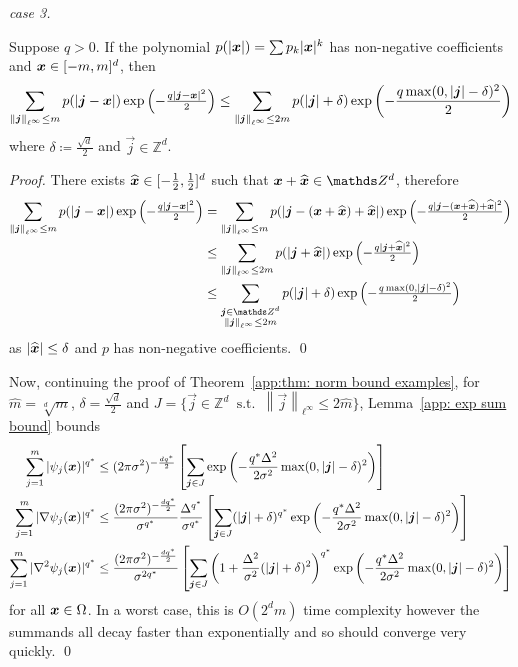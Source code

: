 \documentclass[smallextended]{svjour3}
\let\F\mathds\let\C\mathcal\newcommand{\R}{\F{R}}\newcommand{\A}{\tens{A}}
\newcommand{\norm}[1]{{\left\lVert #1 \right\rVert}}
\newcommand{\1}{\F{1}}
\DeclareMathOperator{\st}{\;s.t.\;}
\renewcommand{\hat}{\widehat}\renewcommand{\tilde}{\widetilde}
\newcommand*{\vard}[1]{%
	\IfEqCase{#1}{%
		{0}{\varphi}%
		{1}{\psi}%
	}[\varphi #1]%
}
\newcommand*{\varx}[1]{%
	\IfEqCase{#1}{%
		{0}{x}%
		{1}{y}%
		{2}{z}%
		{3}{r}%
	}[x#1]%
}
\newcommand{\Domain}{\Omega}\newcommand{\domain}{\omega}
\newcommand*{\vvarx}[1]{\vec{\varx{#1}}}
\begin{document}
\begin{proof}[case 3]
		\begin{lemma}\label{app: exp sum bound}
			Suppose $q>0$. If the polynomial $p(|\vvarx0|) = \sum p_k|\vvarx0|^k$ has non-negative coefficients and $\vvarx0\in[-m,m]^d$, then
			$$\sum_{\norm{\vec{j}}_{\ell^\infty}\leq m} p(|\vec{j}-\vvarx0|)\exp\left(-\tfrac{q|\vec{j}-\vvarx0|^2}{2}\right)\leq \sum_{\norm{\vec{j}}_{\ell^\infty}\leq2m}p(|\vec{j}|+\delta)\exp\left(-\frac{q\max(0,|\vec{j}|-\delta)^2}{2}\right)$$
			where $\delta\coloneqq \frac{\sqrt{d}}{2}$ and $\vec{j}\in\F Z^d$.
		\end{lemma}
		\begin{proof}
			There exists $\hat{\vvarx0}\in[-\tfrac12,\tfrac12]^d$ such that $\vvarx0 + \hat{\vvarx0}\in\F Z^d$, therefore
			\begin{align*}
				\sum_{\norm{\vec{j}}_{\ell^\infty}\leq m} p(|\vec{j}-\vvarx0|)\exp\left(-\tfrac{q|\vec{j}-\vvarx0|^2}{2}\right) &= \sum_{\norm{\vec{j}}_{\ell^\infty}\leq m} p(|\vec{j}-(\vvarx0+\hat{\vvarx0})+\hat{\vvarx0}|)\exp\left(-\tfrac{q|\vec{j}-(\vvarx0+\hat{\vvarx0})+\hat{\vvarx0}|^2}{2}\right)
				\\&\leq \sum_{\norm{\vec{j}}_{\ell^\infty}\leq2m} p(|\vec{j}+\hat{\vvarx0}|)\exp\left(-\tfrac{q|\vec{j}+\hat{\vvarx0}|^2}{2}\right)
				\\&\leq \sum_{\substack{\vec{j}\in\F Z^d\\\norm{\vec{j}}_{\ell^\infty}\leq2m}} p(|\vec{j}|+\delta)\exp\left(-\tfrac{q\max(0,|\vec{j}|-\delta)^2}{2}\right)
			\end{align*}
			as $|\hat{\vvarx0}|\leq \delta$ and $p$ has non-negative coefficients. 
			\qed\end{proof}
		
		Now, continuing the proof of Theorem~\ref{app:thm: norm bound examples}, for $\hat m=\sqrt[d]{m}$, $\delta=\frac{\sqrt{d}}{2}$ and $J=\{\vec{j}\in\F Z^d \st \norm{\vec{j}}_{\ell^\infty}\leq 2\hat m\}$, Lemma~\ref{app: exp sum bound} bounds 
		\begin{align*}
			\sum_{j=1}^m |\vard1_j(\vvarx0)|^{q^*} &\leq (2\pi\sigma^2)^{-\frac{dq^*}{2}} \left[\sum_{\vec{j}\in J} \exp\left(-\frac{q^*\Delta^2}{2\sigma^2}\max(0,|\vec{j}|-\delta)^2\right)\right]
			\\\sum_{j=1}^m |\nabla\vard1_j(\vvarx0)|^{q^*} &\leq \frac{(2\pi\sigma^2)^{-\frac{dq^*}{2}}}{\sigma^{q^*}}\frac{\Delta^{q^*}}{\sigma^{q^*}} \left[\sum_{\vec{j}\in J} (|\vec{j}|+\delta)^{q^*}\exp\left(-\frac{q^*\Delta^2}{2\sigma^2}\max(0,|\vec{j}|-\delta)^2\right)\right]
			\\\sum_{j=1}^m |\nabla^2\vard1_j(\vvarx0)|^{q^*} &\leq \frac{(2\pi\sigma^2)^{-\frac{dq^*}{2}}}{\sigma^{2q^*}} \left[\sum_{\vec{j}\in J} \left(1+\frac{\Delta^2}{\sigma^2}(|\vec{j}|+\delta)^2\right)^{q^*}\exp\left(-\frac{q^*\Delta^2}{2\sigma^2}\max(0,|\vec{j}|-\delta)^2\right)\right]
		\end{align*}
		for all $\vvarx0\in\Domain$. In a worst case, this is $O(2^dm)$ time complexity however the summands all decay faster than exponentially and so should converge very quickly.	
		\qed\end{proof}
	
	
\end{document}

